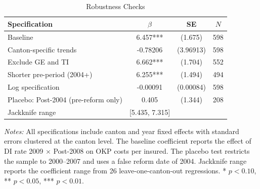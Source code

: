 \begin{table}[H]
\centering
\caption{Robustness Checks}
\begin{threeparttable}
\begin{tabular}{lccc}
\toprule
Specification & $\hat{\beta}$ & SE & $N$ \\
\midrule
Baseline & 6.457*** & (1.675) & 598 \\
Canton-specific trends & -0.78206 & (3.96913) & 598 \\
Exclude GE and TI & 6.662*** & (1.704) & 552 \\
Shorter pre-period (2004+) & 6.255*** & (1.494) & 494 \\
Log specification & -0.00091 & (0.00084) & 598 \\
\midrule
Placebo: Post-2004 (pre-reform only) & 0.405 & (1.344) & 208 \\
Jackknife range & [5.435, 7.315] & & \\
\bottomrule
\end{tabular}
\begin{tablenotes}[flushleft]
\small
\item \textit{Notes:} All specifications include canton and year fixed effects with standard errors clustered at the canton level. The baseline coefficient reports the effect of DI rate 2009 $\times$ Post-2008 on OKP costs per insured. The placebo test restricts the sample to 2000--2007 and uses a false reform date of 2004. Jackknife range reports the coefficient range from 26 leave-one-canton-out regressions. * $p<0.10$, ** $p<0.05$, *** $p<0.01$.
\end{tablenotes}
\end{threeparttable}
\label{tab:robust}
\end{table}
